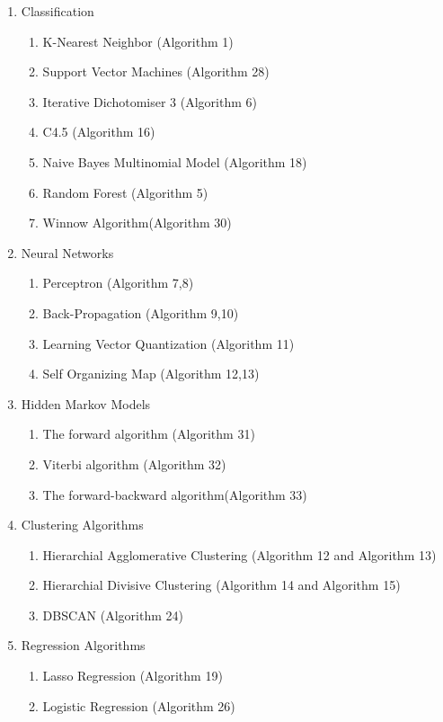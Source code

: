 \documentclass[a4paper]{article}
\begin{document}
\begin{enumerate}
\item Classification 
	\begin{enumerate}
	\item  K-Nearest Neighbor (Algorithm 1)
	\item Support Vector Machines (Algorithm 28)
	\item Iterative Dichotomiser 3 (Algorithm 6)
	\item C4.5 (Algorithm 16)
	\item Naive Bayes Multinomial Model (Algorithm 18)
	\item  Random Forest (Algorithm 5)
	\item Winnow Algorithm(Algorithm 30)
	
	\end{enumerate}
 

	
	
\item Neural Networks
\begin{enumerate}
	\item Perceptron (Algorithm 7,8)
	\item Back-Propagation (Algorithm 9,10) 
	\item Learning Vector Quantization (Algorithm 11)
	\item Self Organizing Map (Algorithm 12,13)
	
	
\end{enumerate}	

\item Hidden Markov Models
\begin{enumerate}
\item The forward algorithm (Algorithm 31)
\item Viterbi algorithm (Algorithm 32)
\item The forward-backward algorithm(Algorithm 33)

	
\end{enumerate}	


\item Clustering Algorithms
\begin{enumerate}
   \item Hierarchial Agglomerative Clustering (Algorithm 12 and Algorithm 13)
    \item Hierarchial Divisive Clustering (Algorithm 14 and Algorithm 15)
    \item DBSCAN (Algorithm 24)
\end{enumerate}

\item Regression Algorithms
\begin{enumerate}
   \item Lasso Regression (Algorithm 19)
 \item Logistic Regression (Algorithm 26)
\end{enumerate}


\end{enumerate}
\end{document}
